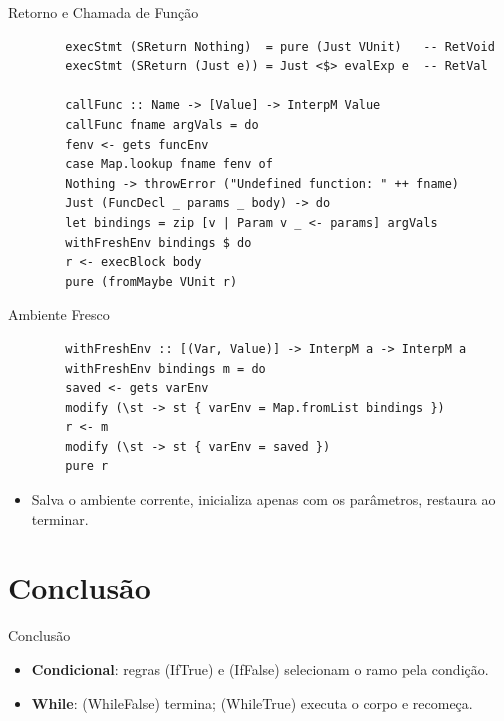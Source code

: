 \begin{frame}[fragile]{Retorno e Chamada de Função}

    \begin{lstlisting}
        execStmt (SReturn Nothing)  = pure (Just VUnit)   -- RetVoid
        execStmt (SReturn (Just e)) = Just <$> evalExp e  -- RetVal

        callFunc :: Name -> [Value] -> InterpM Value
        callFunc fname argVals = do
        fenv <- gets funcEnv
        case Map.lookup fname fenv of
        Nothing -> throwError ("Undefined function: " ++ fname)
        Just (FuncDecl _ params _ body) -> do
        let bindings = zip [v | Param v _ <- params] argVals
        withFreshEnv bindings $ do
        r <- execBlock body
        pure (fromMaybe VUnit r)
    \end{lstlisting}
\end{frame}

\begin{frame}[fragile]{Ambiente Fresco}

    \begin{lstlisting}
        withFreshEnv :: [(Var, Value)] -> InterpM a -> InterpM a
        withFreshEnv bindings m = do
        saved <- gets varEnv
        modify (\st -> st { varEnv = Map.fromList bindings })
        r <- m
        modify (\st -> st { varEnv = saved })
        pure r
    \end{lstlisting}

    \begin{itemize}

        \item
        Salva o ambiente corrente, inicializa apenas com os parâmetros,
        restaura ao terminar.
    \end{itemize}
\end{frame}


\section{Conclusão}\label{conclusuxe3o}

\begin{frame}{Conclusão}

    \begin{itemize}
        \item
        \textbf{Condicional}: regras (IfTrue) e (IfFalse) selecionam o ramo
        pela condição.
        \item
        \textbf{While}: (WhileFalse) termina; (WhileTrue) executa o corpo e
        recomeça.
    \end{itemize}
\end{frame}

